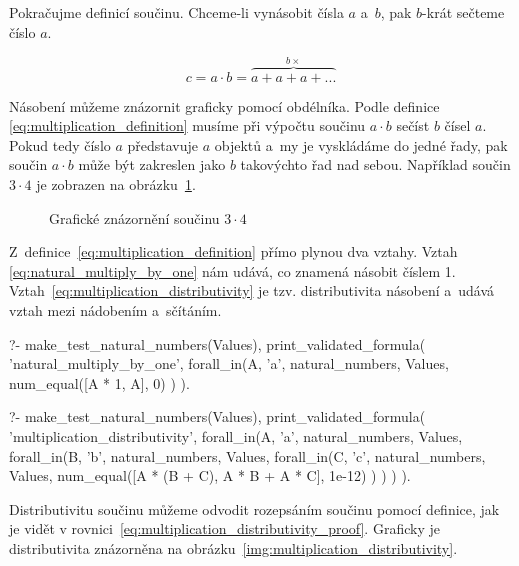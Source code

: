 Pokračujme definicí součinu. Chceme-li vynásobit čísla \(a\) a~\(b\), pak \(b\)-krát sečteme číslo \(a\).

\begin{equation}
\label{eq:multiplication_definition}
c = a \cdot b = \overbrace{a + a + a + ...}^{b \times}
\end{equation}

Násobení můžeme znázornit graficky pomocí obdélníka. Podle definice \eqref{eq:multiplication_definition} musíme při výpočtu součinu \(a \cdot b\) sečíst \(b\) čísel \(a\). Pokud tedy číslo \(a\) představuje \(a\) objektů a~my je vyskládáme do jedné řady, pak součin \(a \cdot b\) může být zakreslen jako \(b\) takovýchto řad nad sebou. Například součin \(3 \cdot 4\) je zobrazen na obrázku~\ref{img:multiplication_definition}. 

\begin{figure}[!h]
\centering
{}
\caption{Grafické znázornění součinu \(3 \cdot 4\)}
\label{img:multiplication_definition}
\end{figure}

Z~definice~\eqref{eq:multiplication_definition} přímo plynou dva vztahy. Vztah \eqref{eq:natural_multiply_by_one} nám udává, co znamená násobit číslem 1. Vztah~\eqref{eq:multiplication_distributivity} je tzv. distributivita násobení a~udává vztah mezi nádobením a~sčítáním.

\begin{fact}
\begin{prolog}
?-	make_test_natural_numbers(Values),
	print_validated_formula(
		'natural_multiply_by_one',
		forall_in(A, 'a', natural_numbers, Values,
			num_equal([A * 1, A], 0)
		)
	).				
\end{prolog}
\begin{prolog}
?-	make_test_natural_numbers(Values),
	print_validated_formula(
		'multiplication_distributivity',
		forall_in(A, 'a', natural_numbers, Values,
			forall_in(B, 'b', natural_numbers, Values,
				forall_in(C, 'c', natural_numbers, Values,
					num_equal([A * (B + C), A * B + A * C], 1e-12)
				)
			)
		)
	).				
\end{prolog}
\end{fact}

Distributivitu součinu můžeme odvodit rozepsáním součinu pomocí definice, jak je vidět v rovnici~\ref{eq:multiplication_distributivity_proof}. Graficky je distributivita znázorněna na obrázku~\ref{img:multiplication_distributivity}.

